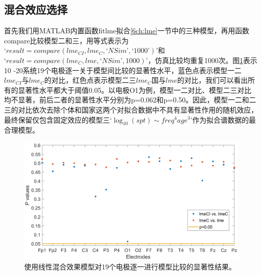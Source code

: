 \subsection{混合效应选择}
首先我们用MATLAB内置函数fitlme拟合\ref{6ch:lme}一节中的三种模型，再用函数compare比较模型二和三，用等式表示为$‘result = compare(lme_{CI}, lme_C, ‘NSim’, ‘1000’)’$和$‘result = compare (lme_C, lme, ‘NSim’, 1000)’$，仿真比较均重复1000次。图\ref{6:pv}表示10
-20系统19个电极逐一关于模型间比较的显著性水平，蓝色点表示模型一二$lme_{CI}$与$lme_C$的对比，红色点表示模型二三$lme_C$国与$lme$的对比，我们可以看出所有的显著性水平都大于阈值0.05。以电极O1为例，模型一二对比、模型二三对比均不显著，前后二者的显著性水平分别为p=0.062和p=0.50。因此，模型一二和二三的对比依次去除个体和国家这两个对拟合数据中不具有显著性作用的随机效应，最终保留仅包含固定效应的模型三$‘\log_{10}(spt)\sim{freq^4age^3}’$作为拟合谱数据的最合理模型。
\begin{figure}[!ht]
\includegraphics[width=15cm]{pic/Norm/figure5.png}
\caption{使用线性混合效果模型对19个电极逐一进行模型比较的显著性结果。}
\label{6:pv}
\end{figure}

